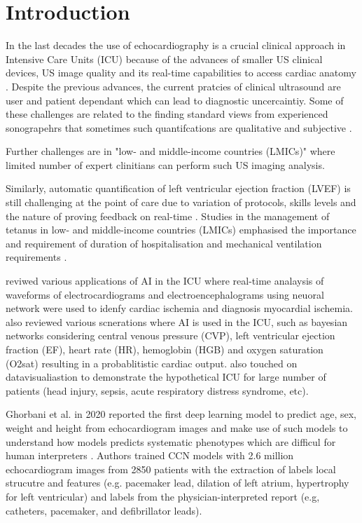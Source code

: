 \section{Introduction} \label{sec:intro}
In the last decades the use of echocardiography is a crucial clinical approach in Intensive Care Units (ICU) because of the advances of smaller US clinical devices, US image quality and its real-time capabilities to access cardiac anatomy \cite{Feigenbaum1996, Vieillard-Baron2008, singh2007, cambell2018}.
Despite the previous advances, the current pratcies of clinical ultrasound are user and patient dependant which can lead to diagnostic uncercaintiy.
Some of these challenges are related to the finding standard views from experienced sonograpehrs that sometimes such quantifcations are qualitative and subjective \cite{Feigenbaum1996}.

Further challenges are in "low- and middle-income countries (LMICs)" where limited number of expert clinitians can perform such US imaging analysis.

Similarly, automatic quantification of left ventricular ejection fraction (LVEF) is still challenging at the point of care due to variation of protocols, skills levels \cite{field2011} and the nature of proving feedback on real-time \cite{liu2021}.
Studies in the management of tetanus in low- and middle-income countries (LMICs) emphasised the importance and requirement of duration of hospitalisation and mechanical ventilation requirements \cite{hao2021-wellcome}.


\cite{hanson2001} reviwed various applications of AI in the ICU where real-time analaysis of waveforms of electrocardiograms and electroencephalograms using neuoral network were used to idenfy cardiac ischemia and diagnosis myocardial ischemia. 
\cite{hanson2001} also reviewed various scnerations where AI is used in the ICU, such as bayesian networks considering central venous pressure (CVP), left ventricular ejection fraction (EF), heart rate (HR), hemoglobin (HGB) and oxygen saturation (O2sat) resulting in a probablitistic cardiac output.
\cite{hanson2001} also touched on datavisualiastion to demonstrate the hypothetical ICU for large number of patients (head injury, sepsis, acute respiratory distress syndrome, etc).


Ghorbani et al. in 2020 reported the first deep learning model to predict age, sex, weight and height from echocardiogram images and make use of such models to understand how models predicts systematic phenotypes which are difficul for human interpreters \cite{Ghorbani-DigitalMedicineNature-JAN2020}.
Authors trained CCN models with 2.6 million echocardiogram images from 2850 patients with the extraction of labels local strucutre and features (e.g. pacemaker lead, dilation of left atrium, hypertrophy for left ventricular) and labels from the physician-interpreted report (e.g, catheters, pacemaker, and deﬁbrillator leads). 


